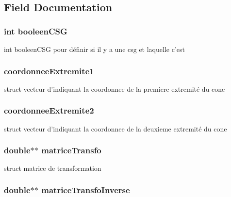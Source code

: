 \subsection{Field Documentation}
\hypertarget{structcone_a4428e32d4383f7dee25e5a4cb192da24}{
\subsubsection[{booleenCSG}]{\setlength{\rightskip}{0pt plus 5cm}int {\bf booleenCSG}}}
\label{structcone_a4428e32d4383f7dee25e5a4cb192da24}
int booleenCSG pour définir si il y a une csg et laquelle c'est \hypertarget{structcone_afb2be5d3ea17eb45de040c4ab9f15a38}{
\subsubsection[{coordonneeExtremite1}]{ {\bf coordonneeExtremite1}}}
\label{structcone_afb2be5d3ea17eb45de040c4ab9f15a38}
struct vecteur d'indiquant la coordonnee de la premiere extremité du cone \hypertarget{structcone_aa1d3b217682ad932e6211bfb18ebb259}{
\subsubsection[{coordonneeExtremite2}]{ {\bf coordonneeExtremite2}}}
\label{structcone_aa1d3b217682ad932e6211bfb18ebb259}
struct vecteur d'indiquant la coordonnee de la deuxieme extremité du cone \hypertarget{structcone_aa06ccc348007e3355beccf412f2f656c}{
\subsubsection[{matriceTransfo}]{\setlength{\rightskip}{0pt plus 5cm}double$\ast$$\ast$ {\bf matriceTransfo}}}
\label{structcone_aa06ccc348007e3355beccf412f2f656c}
struct matrice de transformation \hypertarget{structcone_acd7a3590501dcccfaefccbb658f83821}{
\subsubsection[{matriceTransfoInverse}]{\setlength{\rightskip}{0pt plus 5cm}double$\ast$$\ast$ {\bf matriceTransfoInverse}}}
